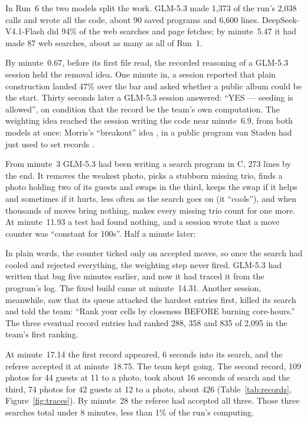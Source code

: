 \documentclass[11pt,letterpaper]{article}
\begin{document}
In Run~6 the two models split the work. GLM-5.3 made 1,373 of the run's 2,038 calls and wrote all the code, about 90 saved programs and 6,600 lines. \mbox{DeepSeek-V4.1-Flash} did 94\% of the web searches and page fetches; by minute~5.47 it had made 87 web searches, about as many as all of Run~1.

By minute~0.67, before its first file read, the recorded reasoning of a GLM-5.3 session held the removal idea. One minute in, a session reported that plain construction landed 47\% over the bar and asked whether a public album could be the start. Thirty seconds later a GLM-5.3 session answered: ``YES --- seeding is allowed'', on condition that the record be the team's own computation. The weighting idea reached the session writing the code near minute~6.9, from both models at once: Morris's ``breakout'' idea \cite{morris}, in a public program van Staden had just used to set records \cite{vanstaden}.

From minute~3 GLM-5.3 had been writing a search program in C, 273 lines by the end. It removes the weakest photo, picks a stubborn missing trio, finds a photo holding two of its guests and swaps in the third, keeps the swap if it helps and sometimes if it hurts, less often as the search goes on (it ``cools''), and when thousands of moves bring nothing, makes every missing trio count for one more. At minute~11.93 a test had found nothing, and a session wrote that a move counter was ``constant for 100s''. Half a minute later:


In plain words, the counter ticked only on accepted moves, so once the search had cooled and rejected everything, the weighting step never fired. GLM-5.3 had written that bug five minutes earlier, and now it had traced it from the program's log. The fixed build came at minute~14.31. Another session, meanwhile, saw that its queue attacked the hardest entries first, killed its search and told the team: ``Rank your cells by closeness BEFORE burning core-hours.'' The three eventual record entries had ranked 288, 358 and 835 of 2,095 in the team's first ranking.

At minute~17.14 the first record appeared, 6 seconds into its search, and the referee accepted it at minute~18.75. The team kept going. The second record, 109 photos for 44 guests at 11 to a photo, took about 16 seconds of search and the third, 74 photos for 42 guests at 12 to a photo, about 426 (Table~\ref{tab:records}, Figure~\ref{fig:traces}). By minute~28 the referee had accepted all three. Those three searches total under 8 minutes, less than 1\% of the run's computing.
\end{document}
